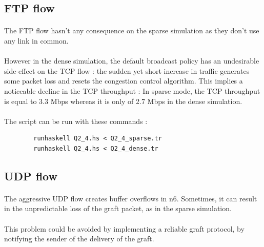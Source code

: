 \documentclass[a4paper]{article}
\begin{document}
  \subsection{FTP flow}

    \paragraph{}The FTP flow hasn't any consequence on the sparse simulation as
they don't use any link in common.

    \paragraph{}However in the dense simulation, the default broadcast policy
has an undesirable side-effect on the TCP flow : the sudden yet short increase
in traffic generates some packet loss and resets the congestion control
algorithm. This implies a noticeable decline in the TCP throughput :
\newline In sparse mode, the TCP throughput is equal to 3.3 Mbps whereas it is
only of 2.7 Mbps in the dense simulation.

    \paragraph{}The script can be run with these commands :
    \begin{verbatim}
        runhaskell Q2_4.hs < Q2_4_sparse.tr
        runhaskell Q2_4.hs < Q2_4_dense.tr
    \end{verbatim}

  \subsection{UDP flow}

    \paragraph{}The aggressive UDP flow creates buffer overflows in n6.
Sometimes, it can result in the unpredictable loss of the graft packet, as in
the sparse simulation.

    \paragraph{}This problem could be avoided by implementing a reliable
graft protocol, by notifying the sender of the delivery of the graft.
\end{document}
